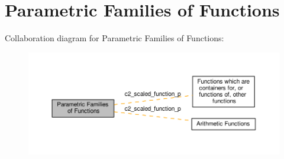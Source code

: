 \hypertarget{group__parametric__functions}{}\section{Parametric Families of Functions}
\label{group__parametric__functions}
Collaboration diagram for Parametric Families of Functions\+:
\nopagebreak
\begin{figure}[H]
\begin{center}
\leavevmode
\includegraphics[width=350pt]{group__parametric__functions}
\end{center}
\end{figure}
